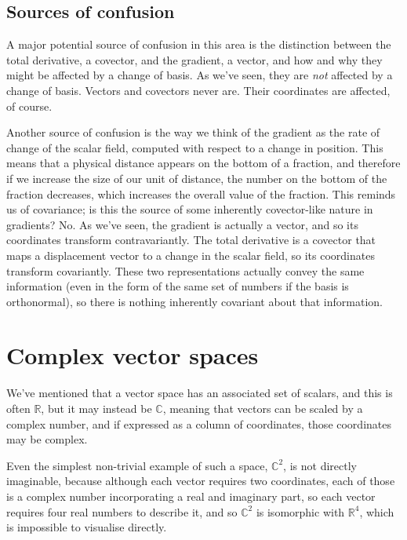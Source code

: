 \subsection{Sources of confusion}

A major potential source of confusion in this area is the distinction between the total derivative, a covector, and the gradient, a vector, and how and why they might be affected by a change of basis. As we've seen, they are \textit{not} affected by a change of basis. Vectors and covectors never are. Their coordinates are affected, of course.

Another source of confusion is the way we think of the gradient as the rate of change of the scalar field, computed with respect to a change in position. This means that a physical distance appears on the bottom of a fraction, and therefore if we increase the size of our unit of distance, the number on the bottom of the fraction decreases, which increases the overall value of the fraction. This reminds us of covariance; is this the source of some inherently covector-like nature in gradients? No. As we've seen, the gradient is actually a vector, and so its coordinates transform contravariantly. The total derivative is a covector that maps a displacement vector to a change in the scalar field, so its coordinates transform covariantly. These two representations actually convey the same information (even in the form of the same set of numbers if the basis is orthonormal), so there is nothing inherently covariant about that information.

\section{Complex vector spaces}\label{sec:vectors-complex}

We've mentioned that a vector space has an associated set of scalars, and this is often $\mathbb{R}$, but it may instead be $\mathbb{C}$, meaning that vectors can be scaled by a complex number, and if expressed as a column of coordinates, those coordinates may be complex.

Even the simplest non-trivial example of such a space, $\mathbb{C}^2$, is not directly imaginable, because although each vector requires two coordinates, each of those is a complex number incorporating a real and imaginary part, so each vector requires four real numbers to describe it, and so $\mathbb{C}^2$ is isomorphic with $\mathbb{R}^4$, which is impossible to visualise directly.


